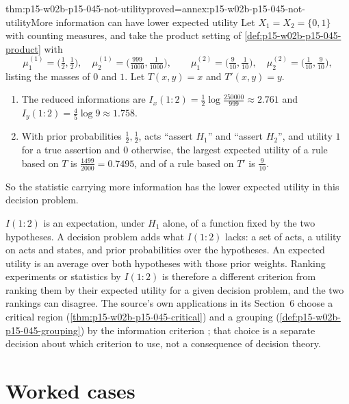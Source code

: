\begin{hbtheorem}{thm:p15-w02b-p15-045-not-utility}{proved=annex:p15-w02b-p15-045-not-utility}{More information can have lower expected utility}
Let \(X_1=X_2=\{0,1\}\) with counting measures, and take the product
setting of \cref{def:p15-w02b-p15-045-product} with
\[
  \mu_1^{(1)}=\bigl(\tfrac12,\tfrac12\bigr),\quad
  \mu_2^{(1)}=\bigl(\tfrac{999}{1000},\tfrac1{1000}\bigr),\qquad
  \mu_1^{(2)}=\bigl(\tfrac9{10},\tfrac1{10}\bigr),\quad
  \mu_2^{(2)}=\bigl(\tfrac1{10},\tfrac9{10}\bigr),
\]
listing the masses of \(0\) and \(1\). Let \(T(x,y)=x\) and
\(T'(x,y)=y\).
\begin{enumerate}
\item The reduced informations are
\(I_x(1:2)=\tfrac12\log\tfrac{250000}{999}\approx2.761\) and
\(I_y(1:2)=\tfrac45\log9\approx1.758\).
\item With prior probabilities \(\tfrac12,\tfrac12\), acts ``assert
\(H_1\)'' and ``assert \(H_2\)'', and utility \(1\) for a true assertion
and \(0\) otherwise, the largest expected utility of a rule based on
\(T\) is \(\tfrac{1499}{2000}=0.7495\), and of a rule based on
\(T'\) is \(\tfrac9{10}\).
\end{enumerate}
So the statistic carrying more information has the lower expected
utility in this decision problem.
\end{hbtheorem}

\(I(1:2)\) is an expectation, under \(H_1\) alone, of a function fixed by
the two hypotheses. A decision problem adds what \(I(1:2)\) lacks: a set
of acts, a utility on acts and states, and prior probabilities over the
hypotheses. An expected utility is an average over both hypotheses with
those prior weights. Ranking experiments or statistics by \(I(1:2)\) is
therefore a different criterion from ranking them by their expected
utility for a given decision problem, and the two rankings can
disagree. The source's own applications in its Section~6 choose a
critical region (\cref{thm:p15-w02b-p15-045-critical}) and a grouping
(\cref{def:p15-w02b-p15-045-grouping}) by the information criterion
\cite[pp.~85--86]{KullbackLeibler1951Information}; that choice is a
separate decision about which criterion to use, not a consequence of
decision theory.

\section{Worked cases}
\label{sec:p15-w02b-p15-045-cases}

